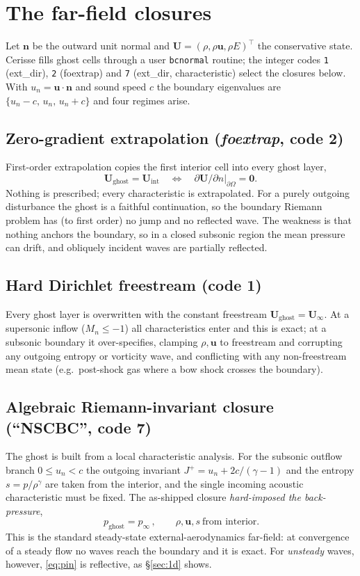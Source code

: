 \documentclass{jfm}
\newcommand{\Uvec}{\mathbf{U}}
\newcommand{\Uinf}{\mathbf{U}_\infty}
\newcommand{\pinf}{p_\infty}
\begin{document}
\section{The far-field closures}\label{sec:closures}
Let $\bm n$ be the outward unit normal and $\Uvec=(\rho,\rho\bm u,\rho E)^\top$
the conservative state. Cerisse fills ghost cells through a user
\texttt{bcnormal} routine; the integer codes \texttt{1} (ext\_dir),
\texttt{2} (foextrap) and \texttt{7} (ext\_dir, characteristic) select the
closures below. With $u_n=\bm u\!\cdot\!\bm n$ and sound speed $c$ the boundary
eigenvalues are $\{u_n-c,\,u_n,\,u_n+c\}$ and four regimes arise.

\subsection{Zero-gradient extrapolation (\textit{foextrap}, code 2)}
First-order extrapolation copies the first interior cell into every ghost layer,
\begin{equation}
\Uvec_{\mathrm{ghost}}=\Uvec_{\mathrm{int}}
\quad\Longleftrightarrow\quad
\partial\Uvec/\partial n|_{\partial\Omega}=\bm 0 .
\end{equation}
Nothing is prescribed; every characteristic is extrapolated. For a purely
outgoing disturbance the ghost is a faithful continuation, so the boundary
Riemann problem has (to first order) no jump and no reflected wave. The weakness
is that nothing anchors the boundary, so in a closed subsonic region the mean
pressure can drift, and obliquely incident waves are partially reflected.

\subsection{Hard Dirichlet freestream (code 1)}
Every ghost layer is overwritten with the constant freestream
$\Uvec_{\mathrm{ghost}}=\Uinf$. At a supersonic inflow ($M_n\le-1$) all
characteristics enter and this is exact; at a subsonic boundary it
over-specifies, clamping $\rho,\bm u$ to freestream and corrupting any outgoing
entropy or vorticity wave, and conflicting with any non-freestream mean state
(e.g.\ post-shock gas where a bow shock crosses the boundary).

\subsection{Algebraic Riemann-invariant closure (``NSCBC'', code 7)}
\label{sec:alg}
The ghost is built from a local characteristic analysis. For the subsonic
outflow branch $0\le u_n<c$ the outgoing invariant $J^+=u_n+2c/(\gamma-1)$ and
the entropy $s=p/\rho^\gamma$ are taken from the interior, and the single
incoming acoustic characteristic must be fixed. The as-shipped closure
\emph{hard-imposed the back-pressure},
\begin{equation}
\boxed{\,p_{\mathrm{ghost}}=\pinf\,},\qquad \rho,\bm u,s\ \text{from interior}.
\label{eq:pin}
\end{equation}
This is the standard steady-state external-aerodynamics far-field: at
convergence of a steady flow no waves reach the boundary and it is exact. For
\emph{unsteady} waves, however, \eqref{eq:pin} is reflective, as \S\ref{sec:1d}
shows.
\end{document}
